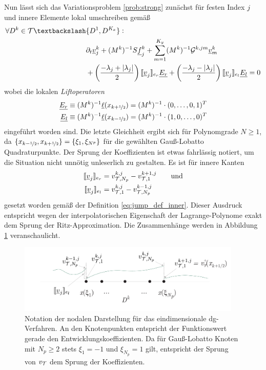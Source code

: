 Nun lässt sich das Variationsproblem \ref{prob:strong} zunächst für festen Index $j$ und innere Elemente lokal umschreiben gemäß
\begin{equation}
  \begin{aligned}
    \forall D^k\in\mathcal{T} \textbackslash &\{D^1,D^{K_x}\} : \\
      &\partial_t \underline{v}_j^k + (M^k)^{-1}S \underline{f}_j^k + \sum_{m=1}^{K_y} (M^k)^{-1}\drift^{k,jm}\underline{v}_m^k \\
      &+ \left(\frac{-\lambda_j + |\lambda_j|}{2}\right) \jump{\underline{v}_j}_{e_r}\underline{E_r} +
         \left(\frac{-\lambda_j - |\lambda_j|}{2}\right) \jump{\underline{v}_j}_{e_l}\underline{E_l} = 0
  \end{aligned}
  \label{eq:schema1}
\end{equation}
wobei die lokalen \emph{Liftoperatoren}
\begin{equation*}
  \begin{aligned}
    \underline{E_r} &\equiv (M^k)^{-1}\underline{\ell}(x_{k+\nicefrac{1}{2}}) = (M^k)^{-1}  \cdot (0,\dots,0,1)^T \\
    \underline{E_l} &\equiv (M^k)^{-1}\underline{\ell}(x_{k-\nicefrac{1}{2}}) = (M^k)^{-1}  \cdot (1,0,\dots,0)^T
  \end{aligned}
\end{equation*}
eingeführt worden sind. Die letzte Gleichheit ergibt sich für Polynomgrade $N\geq{1}$, da ${ \{x_{k-\nicefrac{1}{2}}, x_{k+\nicefrac{1}{2}}\} = \{\xi_1, \xi_{N^p} \} }$ für die gewählten Gauß-Lobatto Quadraturpunkte. Der Sprung der Koeffizienten ist etwas fahrlässig notiert, um die Situation nicht unnötig unleserlich zu gestalten. Es ist für innere Kanten
\begin{align*}
  \llbracket \underline{v}_j \rrbracket_{e_r} &= v_{\mathcal{T},N_p}^{k,j} - v_{\mathcal{T},1}^{k+1,j} \qquad \text{und} \\
  \llbracket \underline{v}_j \rrbracket_{e_l} &= v_{\mathcal{T},1}^{k,j} - v_{\mathcal{T},N_p}^{k-1,j}
\end{align*}
gesetzt worden gemäß der Definition \eqref{eq:jump_def_inner}. Dieser Ausdruck entspricht wegen der interpolatorischen Eigenschaft der Lagrange-Polynome exakt dem Sprung der Ritz-Approximation. Die Zusammenhänge werden in Abbildung \ref{fig:notationDG2} veranschaulicht.
\begin{figure}
  \centering
  \includegraphics[width=0.95\textwidth]{files/notationDG2.pdf}
  \caption{Notation der nodalen Darstellung für das eindimensionale \ac{dg}-Verfahren. An den Knotenpunkten entspricht der Funktionswert gerade den Entwicklungskoeffizienten. Da für Gauß-Lobatto Knoten mit $N_p\geq 2$ stets $\xi_1=-1$ und $\xi_{N_p}=1$ gilt, entspricht der Sprung von $v_{\mathcal{T}}$ dem Sprung der Koeffizienten.}
  \label{fig:notationDG2}
\end{figure}
